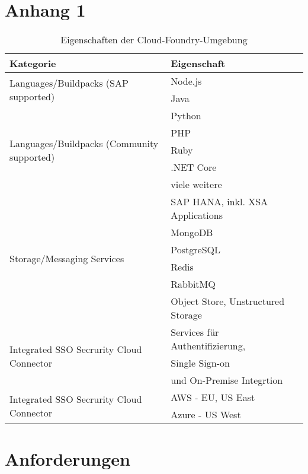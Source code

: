 \newpage
\appendix

\section{Anhang 1}

\begin{table}[h]
  \begin{tabular}{lll}
    \toprule
    Kategorie & Eigenschaft\\
    \midrule
    \multirow[t]{2}{*}{Languages/Buildpacks (SAP supported)} & Node.js  \\
     & Java \\
     \multirow[t]{5}{*}{Languages/Buildpacks (Community supported)} & Python \\
     & PHP \\
     & Ruby \\
     & .NET Core \\
     & viele weitere \\
     \multirow[t]{6}{*}{Storage/Messaging Services} & SAP HANA, inkl. XSA Applications \\
     & MongoDB \\
     & PostgreSQL \\
     & Redis \\
     & RabbitMQ \\
     & Object Store, Unstructured Storage \\
     \multirow[t]{3}{*}{Integrated SSO Secrurity Cloud Connector} & Services für Authentifizierung,\\
     & Single Sign-on \\
     & und On-Premise Integrtion \\
     \multirow[t]{3}{*}{Integrated SSO Secrurity Cloud Connector} & AWS - EU, US East\\
     & Azure - US West  \\
    \bottomrule
    \end{tabular}
    \label{cf_table}
  \caption[Eigenschaften der Cloud-Foundry-Umgebung]{Eigenschaften der Cloud-Foundry-Umgebung \citep[S. 195]{Utecht2018}}
\end{table}


\newpage
\section{Anforderungen}

